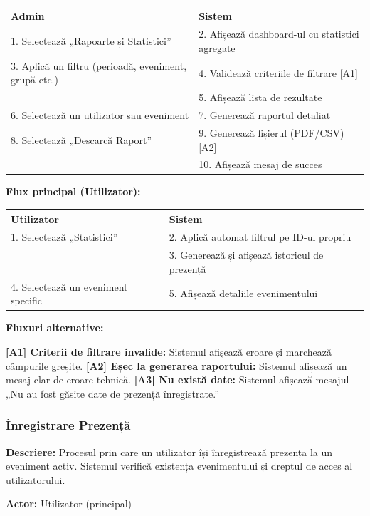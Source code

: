 \documentclass[11pt]{article}
\begin{document}
\begin{tabular}{l l}
\hline
\textbf{Admin} & \textbf{Sistem} \\
\hline
1. Selectează „Rapoarte și Statistici” & 2. Afișează dashboard-ul cu statistici agregate \\
3. Aplică un filtru (perioadă, eveniment, grupă etc.) & 4. Validează criteriile de filtrare [A1] \\
 & 5. Afișează lista de rezultate \\
6. Selectează un utilizator sau eveniment & 7. Generează raportul detaliat \\
8. Selectează „Descarcă Raport” & 9. Generează fișierul (PDF/CSV) [A2] \\
 & 10. Afișează mesaj de succes \\
\hline
\end{tabular}

\textbf{Flux principal (Utilizator):}

\begin{tabular}{l l}
\hline
\textbf{Utilizator} & \textbf{Sistem} \\
\hline
1. Selectează „Statistici” & 2. Aplică automat filtrul pe ID-ul propriu \\
 & 3. Generează și afișează istoricul de prezență \\
4. Selectează un eveniment specific & 5. Afișează detaliile evenimentului \\
\hline
\end{tabular}

\textbf{Fluxuri alternative:}

\textbf{[A1] Criterii de filtrare invalide:} Sistemul afișează eroare și marchează câmpurile greșite.  \newline
\textbf{[A2] Eșec la generarea raportului:} Sistemul afișează un mesaj clar de eroare tehnică.  \newline
\textbf{[A3] Nu există date:} Sistemul afișează mesajul „Nu au fost găsite date de prezență înregistrate.”

\subsubsection{Înregistrare Prezență}


\textbf{Descriere:} Procesul prin care un utilizator își înregistrează prezența la un eveniment activ. Sistemul verifică existența evenimentului și dreptul de acces al utilizatorului.

\textbf{Actor:} Utilizator (principal)
\end{document}
